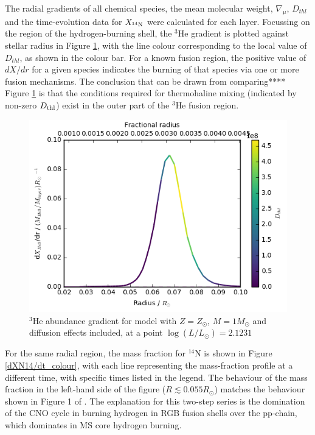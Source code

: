 \documentclass[12pt, a4paper]{report}
\begin{document}
The radial gradients of all chemical species, the mean molecular weight, $\nabla_{\mu}$,  $D_{thl}$ and the time-evolution data for $X_{^{14}\textnormal{N}}$ were calculated for each layer. Focussing on the region of the hydrogen-burning shell, the $^{3}$He gradient is plotted against stellar radius in Figure \ref{dHe3/dr_colour}, with the line colour corresponding to the local value of $D_{thl}$, as shown in the colour bar. For a known fusion region, the positive value of $dX/dr$ for a given species indicates the burning of that species via one or more fusion mechanisms. The conclusion that can be drawn from comparing**** Figure \ref{dHe3/dr_colour} is that the conditions required for thermohaline mixing (indicated by non-zero $D_{\textnormal{thl}}$) exist in the outer part of the $^{3}$He fusion region.

\begin{figure}
\begin{center}
\includegraphics[scale=0.7]{../mu_test_data/mu_test_graphs/eq_logL=2p1231_He3_radius_gradient_Dthl_color_crop.png}
\caption{$^{3}$He abundance gradient for model with $Z = Z_{\odot}$, $M = 1M_{\odot}$ and diffusion effects included, at a point $\log(L/L_{\odot}) = 2.1231$}
\label{dHe3/dr_colour}
\end{center}
\end{figure}

For the same radial region, the mass fraction for $^{14}$N is shown in Figure \ref{dXN14/dt_colour}, with each line representing the mass-fraction profile at a different time, with specific times listed in the legend. The behaviour of the mass fraction in the left-hand side of the figure ($R \lesssim 0.055R_{\odot}$) matches the behaviour shown in Figure 1 of \cite{2007A&A...467L..15C}. The explanation for this two-step series is the domination of the CNO cycle in burning hydrogen in RGB fusion shells over the pp-chain, which dominates in MS core hydrogen burning. 
\end{document}
